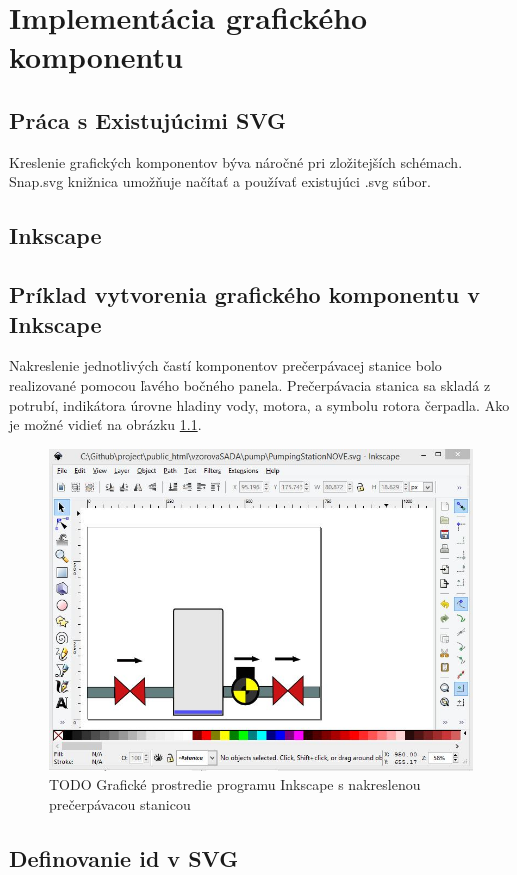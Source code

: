 \chapter{Implementácia grafického komponentu}

\section {Práca s Existujúcimi SVG}
Kreslenie grafických komponentov býva náročné pri zložitejších schémach. Snap.svg knižnica umožňuje načítať a používať existujúci .svg súbor.  


\section{Inkscape}

\section{Príklad vytvorenia grafického komponentu v Inkscape}

Nakreslenie jednotlivých častí komponentov prečerpávacej stanice bolo realizované pomocou ľavého bočného panela. Prečerpávacia stanica sa skladá z potrubí, indikátora úrovne hladiny vody, motora, a symbolu rotora čerpadla. Ako je možné vidieť na obrázku  \ref{picture1}.  


\begin{figure}[H]
	\begin{center}
		\includegraphics[width=0.7\linewidth] {obrazky/pump1.jpg}
		\caption{TODO Grafické prostredie programu Inkscape s nakreslenou prečerpávacou stanicou}
		\label{picture1}
	\end{center}
\end{figure}


\section{Definovanie id v SVG}

